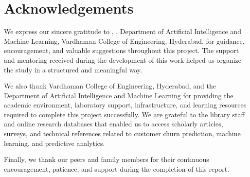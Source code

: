 {}
\chapter*{Acknowledgements}

We express our sincere gratitude to \textbf{\guidename}, \guidedesignation, Department of Artificial Intelligence and Machine Learning, Vardhaman College of Engineering, Hyderabad, for guidance, encouragement, and valuable suggestions throughout this project. The support and mentoring received during the development of this work helped us organize the study in a structured and meaningful way.

We also thank Vardhaman College of Engineering, Hyderabad, and the Department of Artificial Intelligence and Machine Learning for providing the academic environment, laboratory support, infrastructure, and learning resources required to complete this project successfully. We are grateful to the library staff and online research databases that enabled us to access scholarly articles, surveys, and technical references related to customer churn prediction, machine learning, and predictive analytics.

Finally, we thank our peers and family members for their continuous encouragement, patience, and support during the completion of this report.

\begin{flushright}
\textbf{\studentA}\\[0.075in]
\textbf{\studentB}\\[0.075in]
\textbf{\studentC}
\end{flushright}
\clearpage
